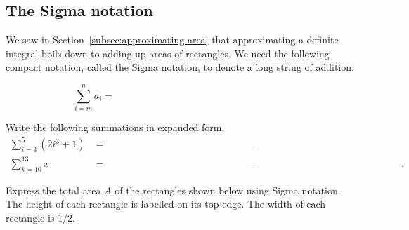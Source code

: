 \documentclass[../main.tex]{subfiles}
\begin{document}
\subsection{The Sigma notation} \label{subsec:sigma}
We saw in Section~\ref{subsec:approximating-area} that approximating a definite integral boils down to adding up areas of rectangles. We need the following compact notation, called the Sigma notation, to denote a long string of addition.

{\huge \[ \sum_{i=m}^{n} a_{i} = \hspace{3in}\]}


\begin{example} \label{ex:sigma-notation-read}
  Write the following summations in expanded form.
  \begin{align*}
    \sum_{i=3}^{5} (2i^{3} + 1)
    &= \underline{\hspace{5in}} \\[3ex]
    \sum_{k=10}^{13} x
    &= \underline{\hspace{5in}}.
  \end{align*}
\end{example}

\begin{example}
  Express the total area \(A\) of the rectangles shown below using Sigma notation. The height of each rectangle is labelled on its top edge.  The width of each rectangle is \(1/2\).

  \begin{center}
    
  \end{center}

  \blanks*
\end{example}
\clearpage

%
\end{document}
